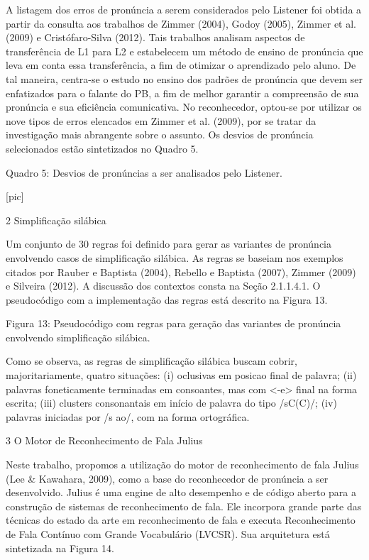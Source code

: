 A listagem dos erros de pron\'uncia a serem considerados pelo Listener foi
obtida a partir da consulta aos trabalhos de Zimmer (2004), Godoy
(2005), Zimmer et al. (2009) e Crist\'ofaro-Silva (2012). Tais trabalhos
analisam aspectos de transfer\^encia de L1 para L2 e estabelecem um m\'etodo
de ensino de pron\'uncia que leva em conta essa transfer\^encia, a fim de
otimizar o aprendizado pelo aluno. De tal maneira, centra-se o estudo no
ensino dos padr\~oes de pron\'uncia que devem ser enfatizados para o falante
do PB, a fim de melhor garantir a compreens\~ao de sua pron\'uncia e sua
efici\^encia comunicativa. No reconhecedor, optou-se por utilizar os nove
tipos de erros elencados em Zimmer et al. (2009), por se tratar da
investiga\c{c}\~ao mais abrangente sobre o assunto. Os desvios de pron\'uncia
selecionados est\~ao sintetizados no Quadro 5.

   Quadro 5: Desvios de pron\'uncias a ser analisados pelo Listener.

                                [pic]

2 Simplifica\c{c}\~ao sil\'abica

Um conjunto de 30 regras foi definido para gerar as variantes de
pron\'uncia envolvendo casos de simplifica\c{c}\~ao sil\'abica. As regras se
baseiam nos exemplos citados por Rauber e Baptista (2004), Rebello e
Baptista (2007), Zimmer (2009) e Silveira (2012). A discuss\~ao dos
contextos consta na Se\c{c}\~ao 2.1.1.4.1. O pseudoc\'odigo com a implementa\c{c}\~ao
das regras est\'a descrito na Figura 13.

Figura 13: Pseudoc\'odigo com regras para gera\c{c}\~ao das variantes de
pron\'uncia envolvendo simplifica\c{c}\~ao sil\'abica.

Como se observa, as regras de simplifica\c{c}\~ao sil\'abica buscam cobrir,
majoritariamente, quatro situa\c{c}\~oes: (i) oclusivas em posicao final de
palavra; (ii) palavras foneticamente terminadas em consoantes, mas com
\textless{}-e\textgreater{} final na forma escrita; (iii) clusters
consonantais em in\'icio de palavra do tipo /sC(C)/; (iv) palavras
iniciadas por /s ao/, com na forma ortogr\'afica.

3 O Motor de Reconhecimento de Fala Julius

Neste trabalho, propomos a utiliza\c{c}\~ao do motor de reconhecimento de fala
Julius (Lee \& Kawahara, 2009), como a base do reconhecedor de pron\'uncia
a ser desenvolvido. Julius \'e uma engine de alto desempenho e de c\'odigo
aberto para a constru\c{c}\~ao de sistemas de reconhecimento de fala. Ele
incorpora grande parte das t\'ecnicas do estado da arte em reconhecimento
de fala e executa Reconhecimento de Fala Cont\'inuo com Grande Vocabul\'ario
(LVCSR). Sua arquitetura est\'a sintetizada na Figura 14.

